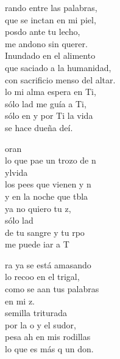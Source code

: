 \begin{cancion}%
	rando entre las palabras,\\
	que se inctan en mi piel,\\
	posdo ante tu lecho,\\
	me andono sin querer.\\
	\jump
	\jump
Inundado en el alimento\\
	que saciado a la humanidad,\\
	con sacrificio menso del altar.\\
	lo mi alma espera en Ti,  \\
	sólo lad me guía a Ti, \\
	sólo en y por Ti la vida \\
	se hace dueña deí. \jump\\
	\begin{chorus}%
		oran \\
		lo que pae un trozo de n\\
		ylvida \\
		los pees que vienen y n \\
		y en la noche que tbla \\
		ya no quiero tu z, \\
		sólo lad \\
		de tu sangre y tu rpo  \\
		me puede iar a T\jump\\
	\end{chorus}%
	\jump
	ra ya se está amasando \\
	lo recoo en el trigal, \\
	como se aan tus palabras \\
	en mi z. \\
	\jump
	 semilla triturada \\
	por la o y el sudor, \\
	pesa ah en mis rodillas\\
	lo que es más q un don.\\

\end{cancion}
